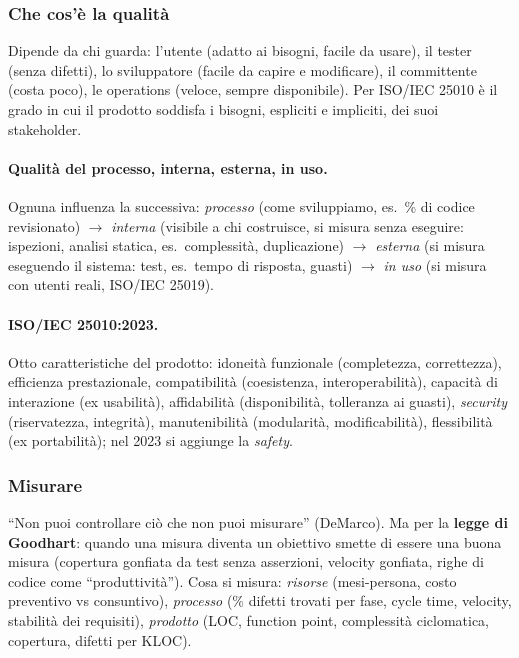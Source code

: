 \documentclass[a4paper,12pt]{article}
\begin{document}
\subsubsection{Che cos'è la qualità}
Dipende da chi guarda: l'utente (adatto ai bisogni, facile da usare), il tester (senza
difetti), lo sviluppatore (facile da capire e modificare), il committente (costa poco), le
operations (veloce, sempre disponibile). Per ISO/IEC 25010 è il grado in cui il prodotto
soddisfa i bisogni, espliciti e impliciti, dei suoi stakeholder.

\paragraph{Qualità del processo, interna, esterna, in uso.} Ognuna influenza la successiva:
\emph{processo} (come sviluppiamo, es.\ \% di codice revisionato) $\to$ \emph{interna}
(visibile a chi costruisce, si misura senza eseguire: ispezioni, analisi statica, es.\
complessità, duplicazione) $\to$ \emph{esterna} (si misura eseguendo il sistema: test, es.\
tempo di risposta, guasti) $\to$ \emph{in uso} (si misura con utenti reali, ISO/IEC 25019).

\paragraph{ISO/IEC 25010:2023.} Otto caratteristiche del prodotto: idoneità funzionale
(completezza, correttezza), efficienza prestazionale, compatibilità (coesistenza,
interoperabilità), capacità di interazione (ex usabilità), affidabilità (disponibilità,
tolleranza ai guasti), \emph{security} (riservatezza, integrità), manutenibilità (modularità,
modificabilità), flessibilità (ex portabilità); nel 2023 si aggiunge la \emph{safety}.

\subsubsection{Misurare}
``Non puoi controllare ciò che non puoi misurare'' (DeMarco). Ma per la \textbf{legge di
Goodhart}: quando una misura diventa un obiettivo smette di essere una buona misura
(copertura gonfiata da test senza asserzioni, velocity gonfiata, righe di codice come
``produttività''). Cosa si misura: \emph{risorse} (mesi-persona, costo preventivo vs
consuntivo), \emph{processo} (\% difetti trovati per fase, cycle time, velocity, stabilità
dei requisiti), \emph{prodotto} (LOC, function point, complessità ciclomatica, copertura,
difetti per KLOC).
\end{document}
